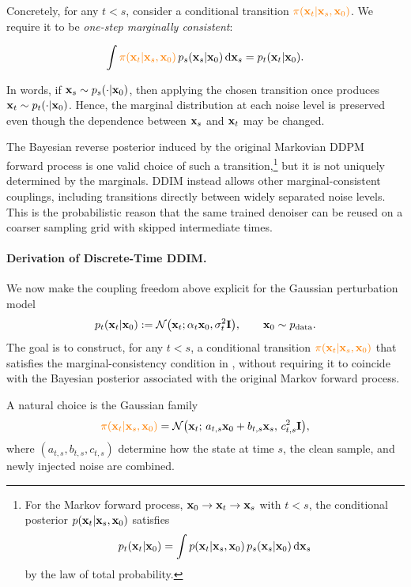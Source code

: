 Concretely, for any $t<s$, consider a conditional transition
${\color{orange}\pi({\mathbf{x}}_t|{\mathbf{x}}_s,{\mathbf{x}}_0)}$. We require it to be
\emph{one-step marginally consistent}:
\begin{mdframed}
\begin{align}
\label{eq:ddim-reverse-kernel-def}
\int
{\color{orange}\pi({\mathbf{x}}_t|{\mathbf{x}}_s,{\mathbf{x}}_0)}
\,p_s({\mathbf{x}}_s|{\mathbf{x}}_0)
\mathop{}\!\mathrm{d}{\mathbf{x}}_s
=
p_t({\mathbf{x}}_t|{\mathbf{x}}_0).
\end{align}
\end{mdframed}
In words, if
${\mathbf{x}}_s\sim p_s(\cdot|{\mathbf{x}}_0)$, then applying the chosen transition once
produces
${\mathbf{x}}_t\sim p_t(\cdot|{\mathbf{x}}_0)$. Hence, the marginal distribution at each
noise level is preserved even though the dependence between
${\mathbf{x}}_s$ and ${\mathbf{x}}_t$ may be changed.

The Bayesian reverse posterior induced by the original Markovian DDPM
forward process is one valid choice of such a transition,\footnote{For the
Markov forward process,
${\mathbf{x}}_0\to{\mathbf{x}}_t\to{\mathbf{x}}_s$ with $t<s$, the conditional posterior
$p({\mathbf{x}}_t|{\mathbf{x}}_s,{\mathbf{x}}_0)$ satisfies
\[
p_t({\mathbf{x}}_t|{\mathbf{x}}_0)
=
\int
p({\mathbf{x}}_t|{\mathbf{x}}_s,{\mathbf{x}}_0)
\,p_s({\mathbf{x}}_s|{\mathbf{x}}_0)
\mathop{}\!\mathrm{d}{\mathbf{x}}_s
\]
by the law of total probability.}
but it is not uniquely determined by the marginals. DDIM instead allows
other marginal-consistent couplings, including transitions directly between
widely separated noise levels. This is the probabilistic reason that the
same trained denoiser can be reused on a coarser sampling grid with skipped
intermediate times.

\paragraph{Derivation of Discrete-Time DDIM.}
We now make the coupling freedom above explicit for the Gaussian perturbation
model
\[
p_t({\mathbf{x}}_t|{\mathbf{x}}_0)
:=
\mathcal{N}
\bigl(
{\mathbf{x}}_t;
\alpha_t{\mathbf{x}}_0,
\sigma_t^2\mathbf{I}
\bigr),
\qquad
{\mathbf{x}}_0\sim p_{\mathrm{data}}.
\]
The goal is to construct, for any $t<s$, a conditional transition
${\color{orange}\pi({\mathbf{x}}_t|{\mathbf{x}}_s,{\mathbf{x}}_0)}$ that satisfies the
marginal-consistency condition in , without
requiring it to coincide with the Bayesian posterior associated with the
original Markov forward process.

A natural choice is the Gaussian family
\begin{align}
\label{eq:ddim-reverse-kernel-param}
{\color{orange}\pi({\mathbf{x}}_t|{\mathbf{x}}_s,{\mathbf{x}}_0)}
=
\mathcal{N}
\bigl(
{\mathbf{x}}_t;\,
a_{t,s}{\mathbf{x}}_0+b_{t,s}{\mathbf{x}}_s,\,
c_{t,s}^2\mathbf{I}
\bigr),
\end{align}
where $(a_{t,s},b_{t,s},c_{t,s})$ determine how the state at time $s$,
the clean sample, and newly injected noise are combined.

